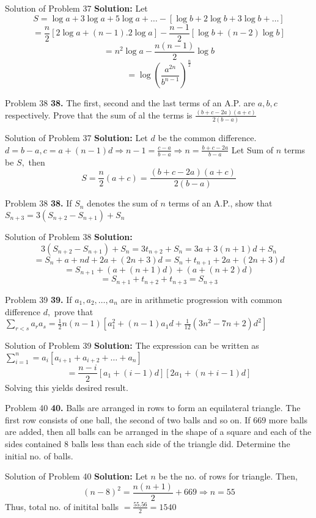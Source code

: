 \documentclass[aspectratio=1610,8pt]{beamer}
\begin{document}
\begin{frame}{Solution of Problem 37}
  \textbf{Solution:} Let $$S = \log a + 3\log a + 5\log a + \ldots - [\log b + 2\log b + 3\log b + \ldots]$$
  $$= \frac{n}{2}[2\log a + (n - 1).2\log a] - \frac{n - 1}{2}[\log b + (n - 2)\log b]$$
  $$= n^2\log a - \frac{n(n - 1)}{2}\log b$$
  $$= \log\left(\frac{a^{2n}}{b^{n - 1}}\right)^{\frac{n}{2}}$$
\end{frame}
\begin{frame}{Problem 38}
  \textbf{38.} The first, second and the last terms of an A.P. are $a,b, c$ respectively. Prove that the sum of al the terms is
  $\frac{(b + c - 2a)(a + c)}{2(b - a)}$
\end{frame}
\begin{frame}{Solution of Problem 37}
  \textbf{Solution:} Let $d$ be the common difference. $d = b - a, c = a + (n - 1)d \Rightarrow n - 1 = \frac{c - a}{b - a}
  \Rightarrow n = \frac{b + c - 2a}{b - a}$
  \linebreak\linebreak
  Let Sum of $n$ terms be $S,$ then
  $$S = \frac{n}{2}(a + c) = \frac{(b + c - 2a)(a + c)}{2(b - a)}$$
\end{frame}
\begin{frame}{Problem 38}
  \textbf{38.} If $S_n$ denotes the sum of $n$ terms of an A.P., show that $S_{n + 3} = 3(S_{n + 2} - S_{n + 1}) + S_n$
\end{frame}
\begin{frame}{Solution of Problem 38}
  \textbf{Solution:} $$3(S_{n + 2} - S_{n + 1}) + S_n = 3t_{n + 2} + S_n = 3a + 3(n + 1)d + S_n$$
  $$= S_n + a + nd + 2a + (2n + 3)d  = S_n + t_{n + 1} + 2a + (2n + 3)d $$
  $$= S_{n + 1} + (a + (n + 1)d) + (a + (n + 2)d)$$
  $$= S_{n +1} + t_{n + 2} + t_{n + 3} = S_{n + 3}$$
\end{frame}
\begin{frame}{Problem 39}
  \textbf{39.} If $a_1, a_2, \ldots, a_n$ are in arithmetic progression with common difference $d,$ prove that
  $\sum_{r < s}a_ra_s = \frac{1}{2}n(n - 1)[a_1^2 + (n - 1)a_1d + \frac{1}{12}(3n^2 - 7n + 2)d^2]$
\end{frame}
\begin{frame}{Solution of Problem 39}
  \textbf{Solution:} The expression can be written as $\sum_{i = 1}^n = a_i[a_{i + 1} + a_{i + 2} + \ldots + a_n]$
  $$= \frac{n - i}{2}[a_1 + (i - 1)d][2a_1 + (n + i - 1)d]$$
  Solving this yields desired result.
\end{frame}
\begin{frame}{Problem 40}
  \textbf{40.} Balls are arranged in rows to form an equilateral triangle. The first row consists of one ball, the second of two
  balls and so on. If $669$ more balls are added, then all balls can be arranged in the shape of a square and each of the sides
  contained $8$ balls less than each side of the triangle did. Determine the initial no. of balls.
\end{frame}
\begin{frame}{Solution of Problem 40}
  \textbf{Solution:} Let $n$ be the no. of rows for triangle. Then,
  $$(n - 8)^2 = \frac{n(n + 1)}{2} + 669 \Rightarrow n = 55$$
  Thus, total no. of initital balls $= \frac{55.56}{2} = 1540$
\end{frame}
\end{document}
